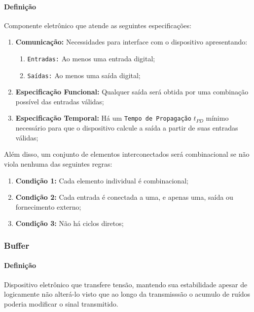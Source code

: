 \documentclass{article}
\begin{document}
            \paragraph{Definição}Componente eletrônico que atende as seguintes especificações:
                \begin{enumerate}[rightmargin = \leftmargin]
                    \item \textbf{Comunicação:} Necessidades para interface com o dispositivo apresentando:
                        \begin{enumerate}[noitemsep]
                            \item \texttt{Entradas:} Ao menos uma entrada digital;
                            \item \texttt{Saídas:} Ao menos uma saída digital;
                        \end{enumerate}

                    \item \textbf{Especificação Funcional:} Qualquer saída será obtida por uma combinação possível das entradas válidas;

                    \item \textbf{Especificação Temporal:} Há um \texttt{Tempo de Propagação} $t_{PD}$ mínimo necessário para que o dispositivo calcule a saída a partir de suas entradas válidas;
                \end{enumerate}
            Além disso, um conjunto de elementos interconectados será combinacional se não viola nenhuma das seguintes regras:
                \begin{enumerate}[noitemsep]
                    \item \textbf{Condição 1:} Cada elemento individual é combinacional;

                    \item \textbf{Condição 2:} Cada entrada é conectada a uma, e apenas uma, saída ou fornecimento externo;

                    \item \textbf{Condição 3:} Não há ciclos diretos;
                \end{enumerate}

        \subsubsection{Buffer}
            \paragraph{Definição}Dispositivo eletrônico que transfere tensão, mantendo sua estabilidade apesar de logicamente não alterá-lo visto que ao longo da transmisssão o acumulo de ruídos poderia modificar o sinal transmitido.
\end{document}
